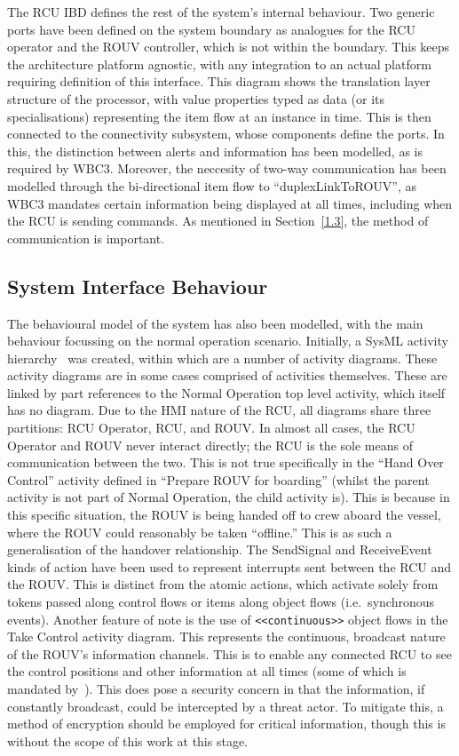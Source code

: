 \documentclass[../main.tex]{subfiles}
\begin{document}
The RCU IBD defines the rest of the system's internal behaviour.
Two generic ports have been defined on the system boundary as analogues for the RCU operator and the ROUV controller, which is not within the boundary.
This keeps the architecture platform agnostic, with any integration to an actual platform requiring definition of this interface.
This diagram shows the translation layer structure of the processor, with value properties typed as data (or its specialisations) representing the item flow at an instance in time.
This is then connected to the connectivity subsystem, whose components define the ports.
In this, the distinction between alerts and information has been modelled, as is required by WBC3\cite{WBC3}.
Moreover, the neccesity of two-way communication has been modelled through the bi-directional item flow to ``duplexLinkToROUV'', as WBC3 mandates certain information being displayed at all times, including when the RCU is sending commands.
As mentioned in Section~\ref{1.3}, the method of communication is important.


\subsection{System Interface Behaviour}\label{2.4}

The behavioural model of the system has also been modelled, with the main behaviour focussing on the normal operation scenario.
Initially, a SysML activity hierarchy~\cite{ObjectManagementGroup2017} was created, within which are a number of activity diagrams.
These activity diagrams are in some cases comprised of activities themselves.
These are linked by part references to the Normal Operation top level activity, which itself has no diagram.
Due to the HMI nature of the RCU, all diagrams share three partitions: RCU Operator, RCU, and ROUV\@.
In almost all cases, the RCU Operator and ROUV never interact directly; the RCU is the sole means of communication between the two.
This is not true specifically in the ``Hand Over Control'' activity defined in ``Prepare ROUV for boarding'' (whilst the parent activity is not part of Normal Operation, the child activity is).
This is because in this specific situation, the ROUV is being handed off to crew aboard the vessel, where the ROUV could reasonably be taken ``offline.''
This is as such a generalisation of the handover relationship.
The SendSignal and ReceiveEvent kinds of action have been used to represent interrupts sent between the RCU and the ROUV\@.
This is distinct from the atomic actions, which activate solely from tokens passed along control flows or items along object flows (i.e.\ synchronous events).
Another feature of note is the use of \texttt{<<continuous>>} object flows in the Take Control activity diagram.
This represents the continuous, broadcast nature of the ROUV's information channels.
This is to enable any connected RCU to see the control positions and other information at all times (some of which is mandated by~\cite{WBC3}).
This does pose a security concern in that the information, if constantly broadcast, could be intercepted by a threat actor.
To mitigate this, a method of encryption should be employed for critical information, though this is without the scope of this work at this stage.
\end{document}
